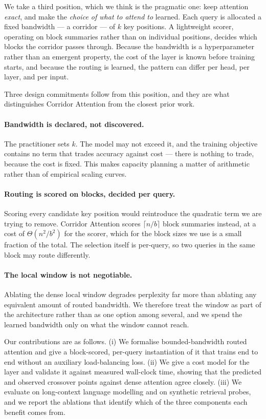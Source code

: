 \documentclass[11pt]{article}
\begin{document}
We take a third position, which we think is the pragmatic one: keep attention
\emph{exact}, and make the \emph{choice of what to attend to} learned. Each
query is allocated a fixed bandwidth --- a corridor --- of $k$ key positions.
A lightweight scorer, operating on block summaries rather than on individual
positions, decides which blocks the corridor passes through. Because the
bandwidth is a hyperparameter rather than an emergent property, the cost of the
layer is known before training starts, and because the routing is learned, the
pattern can differ per head, per layer, and per input.

Three design commitments follow from this position, and they are what
distinguishes Corridor Attention from the closest prior work.

\paragraph{Bandwidth is declared, not discovered.} The practitioner sets $k$.
The model may not exceed it, and the training objective contains no term that
trades accuracy against cost --- there is nothing to trade, because the cost is
fixed. This makes capacity planning a matter of arithmetic rather than of
empirical scaling curves.

\paragraph{Routing is scored on blocks, decided per query.} Scoring every
candidate key position would reintroduce the quadratic term we are trying to
remove. Corridor Attention scores $\lceil n / b \rceil$ block summaries
instead, at a cost of $\Theta(n^2 / b^2)$ for the scorer, which for the block
sizes we use is a small fraction of the total. The selection itself is
per-query, so two queries in the same block may route differently.

\paragraph{The local window is not negotiable.} Ablating the dense local
window degrades perplexity far more than ablating any equivalent amount of
routed bandwidth. We therefore treat the window as part of the architecture
rather than as one option among several, and we spend the learned bandwidth
only on what the window cannot reach.

Our contributions are as follows. (i) We formalise bounded-bandwidth routed
attention and give a block-scored, per-query instantiation of it that trains
end to end without an auxiliary load-balancing loss. (ii) We give a cost model
for the layer and validate it against measured wall-clock time, showing that
the predicted and observed crossover points against dense attention agree
closely. (iii) We evaluate on long-context language modelling and on synthetic
retrieval probes, and we report the ablations that identify which of the three
components each benefit comes from.
\end{document}
